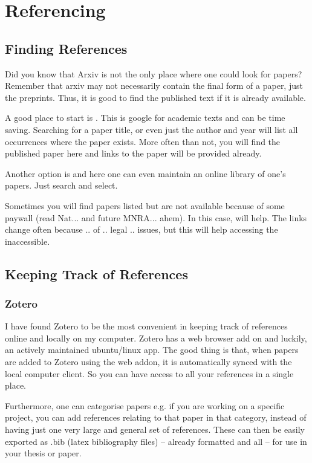 \section{Referencing}
\subsection{Finding References}
    Did you know that Arxiv is not the only place where one could look for papers? Remember that arxiv may not necessarily contain the final form of a paper, just the preprints. Thus, it is good to find the published text if it is already available. 

    A good place to start is . This is google for academic texts and can be time saving. Searching for a paper title, or even just the author and year will list all occurrences where the paper exists. More often than not, you will find the published paper here and links to the paper will be provided already.

    Another option is  and here one can even maintain an online library of one’s papers. Just search and select.

    Sometimes you will find papers listed but are not available because of some paywall (read Nat... and future MNRA... ahem). In this case,  will help. The links change often because .. of .. legal .. issues, but this will help accessing the inaccessible.

\subsection{Keeping Track of References}
\subsubsection*{Zotero}
    I have found Zotero to be the most convenient in keeping track of references online and locally on my computer. Zotero has a web browser add on and luckily, an actively maintained ubuntu/linux app. The good thing is that, when papers are added to Zotero using the web addon, it is automatically synced with the local computer client. So you can have access to all your references in a single place.

    Furthermore, one can categorise papers e.g. if you are working on a specific project, you can add references relating to that paper in that category, instead of having just one very large and general set of references. These can then be easily exported as .bib (latex bibliography files) -- already formatted and all -- for use in your thesis or paper.


